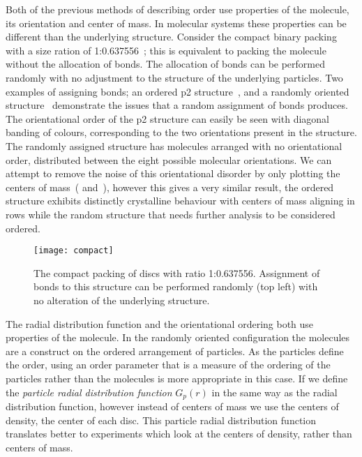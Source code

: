 Both of the previous methods of describing order use properties of the molecule, its orientation and center of mass. In molecular systems these properties can be different than the underlying structure. Consider the compact binary packing with a size ration of 1:0.637556~; this is equivalent to packing the \scon molecule without the allocation of bonds. The allocation of bonds can be performed randomly with no adjustment to the structure of the underlying particles. Two examples of assigning bonds; an ordered p2 structure~, and a randomly oriented structure~ demonstrate the issues that a random assignment of bonds produces. The orientational order of the p2 structure can easily be seen with diagonal banding of colours, corresponding to the two orientations present in the structure. The randomly assigned structure has molecules arranged with no orientational order, distributed between the eight possible molecular orientations. We can attempt to remove the noise of this orientational disorder by only plotting the centers of mass~( and~), however this gives a very similar result, the ordered structure exhibits distinctly crystalline behaviour with centers of mass aligning in rows while the random structure that needs further analysis to be considered ordered.

\begin{figure}
    \centering
    \texttt{[image: compact]}
    \caption{The compact packing of discs with ratio 1:0.637556. Assignment of bonds to this structure can be performed randomly (top left) with no alteration of the underlying structure.}
    \label{fig:compact}
\end{figure}

The radial distribution function and the orientational ordering both use properties of the molecule. In the randomly oriented configuration the molecules are a construct on the ordered arrangement of particles. As the particles define the order, using an order parameter that is a measure of the ordering of the particles rather than the molecules is more appropriate in this case. If we define the \emph{particle radial distribution function} $G_p(r)$ in the same way as the radial distribution function, however instead of centers of mass we use the centers of density, the center of each disc. This particle radial distribution function translates better to experiments which look at the centers of density, rather than centers of mass. 

